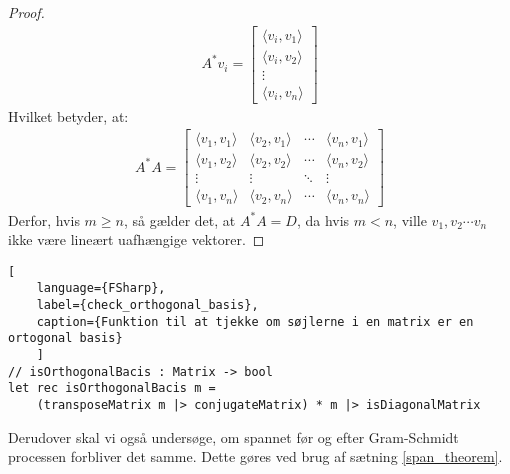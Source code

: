 \begin{theorem}
\begin{proof}
    \begin{gather*}
        A^* v_i = 
        \begin{bmatrix}
            \langle v_i, v_1 \rangle \\
            \langle v_i, v_2 \rangle \\
            \vdots \\
            \langle v_i, v_n \rangle
        \end{bmatrix}
    \end{gather*}
    Hvilket betyder, at:
    \begin{gather*}
        A^*A = 
        \begin{bmatrix}
            \langle v_1, v_1 \rangle & \langle v_2, v_1 \rangle & \cdots & \langle v_n, v_1 \rangle \\
            \langle v_1, v_2 \rangle & \langle v_2, v_2 \rangle & \cdots & \langle v_n, v_2 \rangle \\
            \vdots & \vdots & \ddots & \vdots \\
            \langle v_1, v_n \rangle & \langle v_2, v_n \rangle & \cdots & \langle v_n, v_n \rangle
        \end{bmatrix}
    \end{gather*}
    Derfor, hvis \( m \geq n \), så gælder det, at \( A^*A = D \), da hvis \( m < n \), ville $v_1, v_2 \cdots v_n$ ikke være lineært uafhængige vektorer.
\end{proof}
\end{theorem}
\begin{lstlisting}[
    language={FSharp}, 
    label={check_orthogonal_basis}, 
    caption={Funktion til at tjekke om søjlerne i en matrix er en ortogonal basis}
    ]
// isOrthogonalBacis : Matrix -> bool
let rec isOrthogonalBacis m =
    (transposeMatrix m |> conjugateMatrix) * m |> isDiagonalMatrix
\end{lstlisting}


Derudover skal vi også undersøge, om spannet før og efter Gram-Schmidt processen forbliver det samme. Dette gøres ved brug af sætning \ref{span_theorem}.

\vspace{0.5cm}
    
